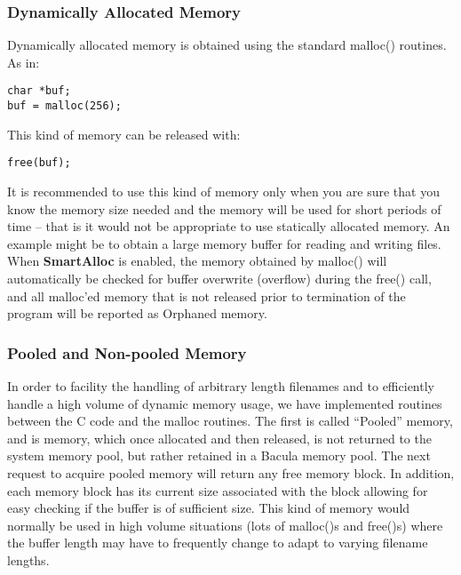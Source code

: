\subsubsection*{Dynamically Allocated Memory}

Dynamically allocated memory is obtained using the standard malloc() routines.
As in: 

\footnotesize
\begin{verbatim}
char *buf;
buf = malloc(256);
\end{verbatim}
\normalsize

This kind of memory can be released with: 

\footnotesize
\begin{verbatim}
free(buf);
\end{verbatim}
\normalsize

It is recommended to use this kind of memory only when you are sure that you
know the memory size needed and the memory will be used for short periods of
time -- that is it would not be appropriate to use statically allocated
memory. An example might be to obtain a large memory buffer for reading and
writing files. When {\bf SmartAlloc} is enabled, the memory obtained by
malloc() will automatically be checked for buffer overwrite (overflow) during
the free() call, and all malloc'ed memory that is not released prior to
termination of the program will be reported as Orphaned memory. 

\subsubsection*{Pooled and Non-pooled Memory}

In order to facility the handling of arbitrary length filenames and to
efficiently handle a high volume of dynamic memory usage, we have implemented
routines between the C code and the malloc routines. The first is called
``Pooled'' memory, and is memory, which once allocated and then released, is
not returned to the system memory pool, but rather retained in a Bacula memory
pool. The next request to acquire pooled memory will return any free memory
block. In addition, each memory block has its current size associated with the
block allowing for easy checking if the buffer is of sufficient size. This
kind of memory would normally be used in high volume situations (lots of
malloc()s and free()s) where the buffer length may have to frequently change
to adapt to varying filename lengths. 

